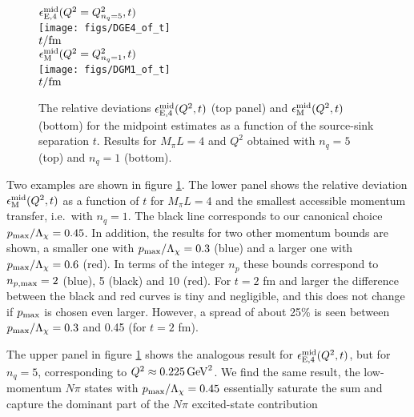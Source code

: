\documentclass[11pt,prd,aps,showpacs,eqsecnum,floatfix,nofootinbib,preprint,tightenlines]{revtex4}
\begin{document}
% 
\begin{figure}[p]
\begin{center}
$\epsilon^{\rm mid}_{\rm E,4}(Q^2=Q^2_{n_q=5},t)$\\[0.4ex]
\texttt{[image: figs/DGE4\_of\_t]}\\[0.4ex]
$t/{\rm fm}$\\[4ex]

$\epsilon^{\rm mid}_{\rm M}(Q^2=Q^2_{n_q=1},t)$\\
\texttt{[image: figs/DGM1\_of\_t]}\\[0.4ex]
$t/{\rm fm}$\\[2ex]
\caption{The relative deviations $\epsilon^{\rm mid}_{\rm E,4}(Q^2,t)$ (top panel) and $\epsilon^{\rm mid}_{\rm M}(Q^2,t)$ (bottom) for the midpoint estimates as a function of the source-sink separation $t$. Results for $M_{\pi}L=4$ 
and $Q^2$ obtained with $n_q=5$ (top) and $n_q=1$ (bottom). 
}
\label{fig:epsDGX_of_t}
\end{center}
\end{figure}

Two examples are shown in figure \ref{fig:epsDGX_of_t}. The lower panel shows the relative deviation $\epsilon^{\rm mid}_{\rm M}(Q^2,t)$ as a function of $t$ for $M_\pi L=4$ and the smallest accessible momentum transfer, i.e.\ with $n_q=1$. The black line corresponds to our canonical choice $p_{\rm max}/\Lambda_{\chi}= 0.45$. In addition, the results for two other momentum bounds are shown, a smaller one with $p_{\rm max}/\Lambda_{\chi}= 0.3$ (blue) and a larger one with $p_{\rm max}/\Lambda_{\chi}= 0.6$ (red). In terms of the integer $n_p$ these bounds correspond to $n_{p,{\rm max}}=2$ (blue), 5 (black) and 10 (red). For $t=2$ fm and larger the difference between the black and red curves is tiny and negligible, and this does not change if $p_{\rm max}$ is chosen even larger. However, a spread of about 25\% is seen between $p_{\rm max}/\Lambda_{\chi}= 0.3$ and 0.45 (for $t=2$ fm).

The upper panel in figure \ref{fig:epsDGX_of_t} shows the analogous result for $\epsilon^{\rm mid}_{\rm E,4}(Q^2,t)$, but for $n_q=5$, corresponding to $Q^2\approx 0.225 \,{\rm GeV}^2$. We find the same result, the low-momentum $N\pi$ states with $p_{\rm max}/\Lambda_{\chi}= 0.45$ essentially saturate the sum and capture the dominant part of the $N\pi$ excited-state contribution
\end{document}
